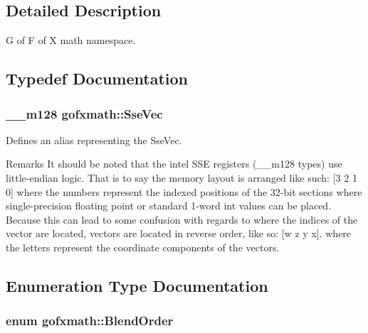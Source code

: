 \subsection{Detailed Description}
G of F of X math namespace. 

\subsection{Typedef Documentation}
\hypertarget{namespacegofxmath_a634570ddcd2496053ee966227080e02f}{}
\subsubsection[{Sse\+Vec}]{\setlength{\rightskip}{0pt plus 5cm}\+\_\+\+\_\+m128 {\bf gofxmath\+::\+Sse\+Vec}}\label{namespacegofxmath_a634570ddcd2496053ee966227080e02f}


Defines an alias representing the Sse\+Vec. 

\begin{DoxyRemark}{Remarks}
It should be noted that the intel\textregistered{} S\+S\+E registers (\+\_\+\+\_\+m128 types) use little-\/endian logic. That is to say the memory layout is arranged like such\+: \mbox{[}3 2 1 0\mbox{]} where the numbers represent the indexed positions of the 32-\/bit sections where single-\/precision floating point or standard 1-\/word int values can be placed. Because this can lead to some confusion with regards to where the indices of the vector are located, vectors are located in reverse order, like so\+: \mbox{[}w z y x\mbox{]}. where the letters represent the coordinate components of the vectors. 
\end{DoxyRemark}


\subsection{Enumeration Type Documentation}
\hypertarget{namespacegofxmath_a2dce5f39d4af2a18b930b7eee34e034f}{}
\subsubsection[{Blend\+Order}]{\setlength{\rightskip}{0pt plus 5cm}enum {\bf gofxmath\+::\+Blend\+Order}}\label{namespacegofxmath_a2dce5f39d4af2a18b930b7eee34e034f}


